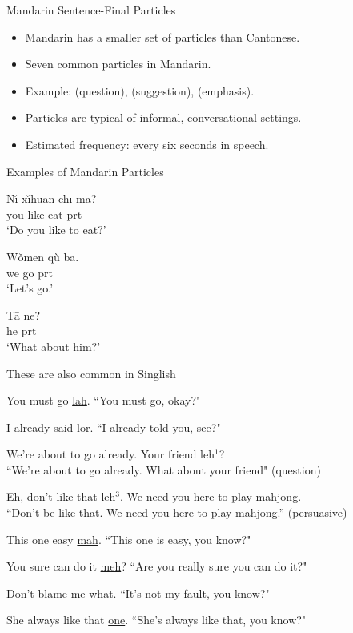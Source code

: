 \documentclass{beamer}
\newcommand{\cmn}{\mtciteform}
\newcommand{\ul}[1]{\uline{#1}}
\begin{document}
\begin{frame}{Mandarin Sentence-Final Particles}
  \begin{itemize}
    \item Mandarin has a smaller set of particles than Cantonese.
    \item Seven common particles in Mandarin.
    \item Example: \cmn{ma} (question), \cmn{ba} (suggestion), \cmn{ne} (emphasis).
    \item Particles are typical of informal, conversational settings.
    \item Estimated frequency: every six seconds in speech.
  \end{itemize}
\end{frame}

\begin{frame}{Examples of Mandarin Particles}
  \begin{exe}
\ex 
    \gll Nı̌ xı̌huan chı̄ ma? \\
         you like eat prt \\
    \trans ‘Do you like to eat?’
  \end{exe}
  \begin{exe}
\ex 
    \gll Wǒmen qù ba. \\
         we go prt \\
    \trans ‘Let's go.’
  \end{exe}
  \begin{exe}
\ex 
    \gll Tā ne? \\
         he prt \\
    \trans ‘What about him?’
  \end{exe}
\end{frame}

\begin{frame}[allowframebreaks]{These are also common in Singlish}
\begin{exe}
  \ex You must go \ul{lah}. ``You must go, okay?"

\ex I already said \ul{lor}. ``I already told you, see?"

\ex  We're about to go already. Your friend  leh$^1$? \\ ``We're about to go already. What about your friend" (question)

\ex
Eh, don't like that leh$^3$. We need you here to play mahjong. \\ ``Don't be like that. We need you here to play mahjong.'' (persuasive)

\ex This one easy \ul{mah}. ``This one is easy, you know?"

\ex You sure can do it \ul{meh}? ``Are you really sure you can do it?"

\ex Don't blame me \ul{what}. ``It's not my fault, you know?"

\ex She always like that \ul{one}. ``She's always like that, you know?"
\end{exe}

\citep{chow-etal-2024-word}
\end{frame}
\end{document}
